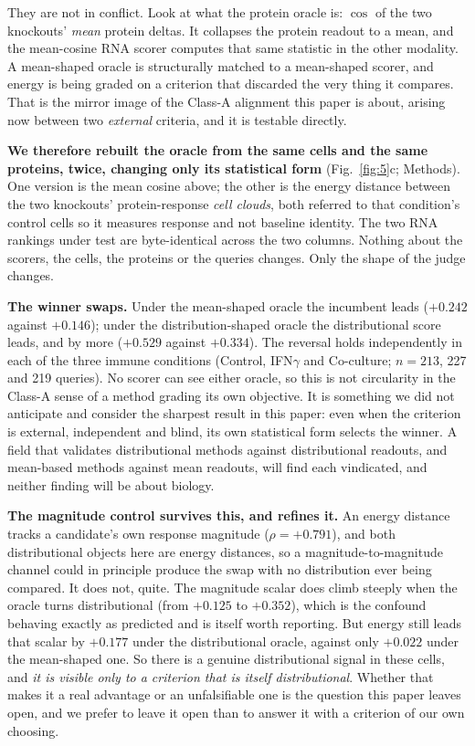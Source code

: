 \documentclass[11pt,letterpaper]{article}
\begin{document}
They are not in conflict. Look at what the protein oracle is: $\cos$ of the two knockouts'
\emph{mean} protein deltas. It collapses the protein readout to a mean, and the mean-cosine RNA
scorer computes that same statistic in the other modality. A mean-shaped oracle is structurally
matched to a mean-shaped scorer, and energy is being graded on a criterion that discarded the very
thing it compares. That is the mirror image of the Class-A alignment this paper is about, arising
now between two \emph{external} criteria, and it is testable directly.

\textbf{We therefore rebuilt the oracle from the same cells and the same proteins, twice, changing
only its statistical form} (Fig.~\ref{fig:5}c; Methods). One version is the mean cosine above; the
other is the energy distance between the two knockouts' protein-response \emph{cell clouds}, both
referred to that condition's control cells so it measures response and not baseline identity. The
two RNA rankings under test are byte-identical across the two columns. Nothing about the scorers,
the cells, the proteins or the queries changes. Only the shape of the judge changes.

\textbf{The winner swaps.} Under the mean-shaped oracle the incumbent leads ($+0.242$ against
$+0.146$); under the distribution-shaped oracle the distributional score leads, and by more
($+0.529$ against $+0.334$). The reversal holds independently in each of the three immune
conditions (Control, IFN$\gamma$ and Co-culture; $n = 213$, 227 and 219 queries). No scorer can see
either oracle, so this is not circularity in the Class-A sense of a method grading its own
objective. It is something we did not anticipate and consider the sharpest result in this paper:
even when the criterion is external, independent and blind, its own statistical form
selects the winner. A field that validates distributional methods against distributional readouts,
and mean-based methods against mean readouts, will find each vindicated, and neither finding will be
about biology.

\textbf{The magnitude control survives this, and refines it.} An energy distance tracks a
candidate's own response magnitude ($\rho = +0.791$), and both distributional objects here are
energy distances, so a magnitude-to-magnitude channel could in principle produce the swap with no
distribution ever being compared. It does not, quite. The magnitude scalar does climb steeply when
the oracle turns distributional (from $+0.125$ to $+0.352$), which is the confound behaving exactly
as predicted and is itself worth reporting. But energy still leads that scalar by $+0.177$ under the
distributional oracle, against only $+0.022$ under the mean-shaped one. So there is a genuine
distributional signal in these cells, and \emph{it is visible only to a criterion that is itself
distributional}. Whether that makes it a real advantage or an unfalsifiable one is the question this
paper leaves open, and we prefer to leave it open than to answer it with a criterion of our own
choosing.
\end{document}
